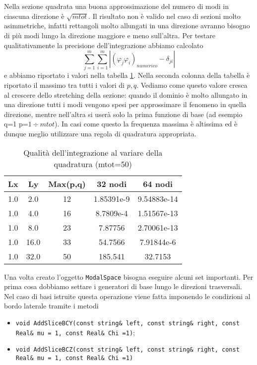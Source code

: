 Nella sezione quadrata una buona approssimazione del numero di modi in ciascuna direzione \`e $\sqrt{mtot}$. Il risultato non \`e valido nel caso di sezioni 
molto asimmetriche, infatti rettangoli molto allungati in una direzione avranno bisogno di pi\`u modi lungo la direzione maggiore e meno 
sull'altra. Per testare qualitativamente la precisione dell'integrazione abbiamo calcolato $$\sum_{j=1}^m\sum_{i=1}^m 
\left|(\varphi_j\varphi_i)_{numerico}- \delta_{ji}\right|$$ e abbiamo riportato i valori nella tabella \ref{quad}.
Nella seconda colonna della tabella \`e riportato il massimo tra tutti i valori di $p,q$. Vediamo come questo valore cresca 
al crescere dello stretching della sezione: quando il dominio \`e molto allungato in una direzione tutti i modi vengono spesi
per approssimare il fenomeno in quella direzione, mentre nell'altra si user\`a solo la prima funzione di base (ad esempio q=1 p=$1\div mtot$).
In casi come questo la frequenza massima \`e altissima ed \`e dunque meglio utilizzare una regola di quadratura appropriata.
\begin{table}[h]
\centering
\begin{tabular}{|c|c|c|c|c|}
\hline
Lx&Ly & Max(p,q) &  32 nodi &  64 nodi \\
\hline
1.0&2.0 & 12 & 1.85391e-9 & 9.54883e-14 \\
\hline
1.0&4.0 & 16 & 8.7809e-4 & 1.51567e-13 \\
\hline
1.0&8.0 & 23 & 7.87756 & 2.70061e-13 \\
\hline
1.0&16.0 & 33 & 54.7566 & 7.91844e-6 \\
\hline
1.0&32.0 & 50 & 185.541 & 32.7153 \\
\hline
\end{tabular}
\caption{Qualit\`a dell'integrazione al variare della quadratura (mtot=50)}
\label{quad}
\end{table}

Una volta creato l'oggetto \texttt{ModalSpace} bisogna eseguire alcuni set importanti. Per prima cosa dobbiamo settare i generatori di base 
lungo le direzioni trasversali. Nel caso di basi istruite questa operazione viene fatta imponendo le condizioni al bordo laterale
tramite i metodi
\begin{itemize}
\item \texttt{void AddSliceBCY(const string\& left, const string\& right, const Real\& mu = 1, const Real\& Chi =1)};
\item \texttt{void AddSliceBCZ(const string\& left, const string\& right, const Real\& mu = 1, const Real\& Chi =1)}
\end{itemize}

